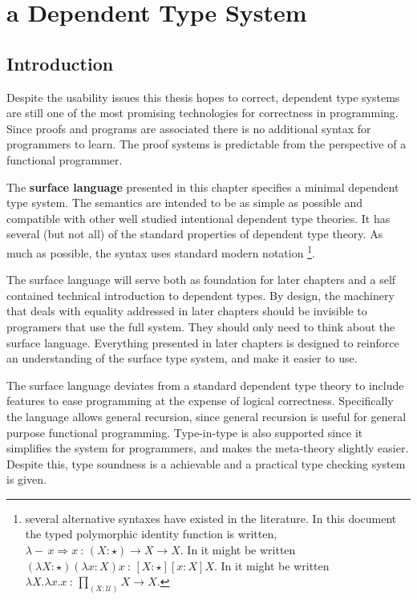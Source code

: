 \chapter{a Dependent Type System} \label{chapter:Surface} \thispagestyle{myheadings}

\section{Introduction}

Despite the usability issues this thesis hopes to correct, dependent type systems are still one of the most promising technologies for correctness in programming.
Since proofs and programs are associated there is no additional syntax for programmers to learn.
The proof systems is predictable from the perspective of a functional programmer.

The \textbf{surface language} presented in this chapter specifies a minimal dependent type system.
The semantics are intended to be as simple as possible and compatible with other well studied intentional dependent type theories.
It has several (but not all) of the standard properties of dependent type theory.
As much as possible, the syntax uses standard modern notation \footnote{several alternative syntaxes have existed in the literature.
In this document the typed polymorphic identity function is written, $\lambda-\,x\Rightarrow x\ :\,\left(X:\star\right)\rightarrow X\rightarrow X$.
In \cite{10.1016/0890-5401(88)90005-3} it might be written $\left(\lambda X:\star\right)\left(\lambda x:X\right)x\ :\,\left[X:\star\right]\left[x:X\right]X$.
In \cite{HoTTbook} it might be written $\lambda X.\lambda x.x\ :\,\underset{\left(X:\mathcal{U}\right)}{\prod}X\rightarrow X$.}.


The surface language will serve both as foundation for later chapters and a self contained technical introduction to dependent types.
By design, the machinery that deals with equality addressed in later chapters should be invisible to programers that use the full system.
They should only need to think about the surface language.
Everything presented in later chapters is designed to reinforce an understanding of the surface type system, and make it easier to use.


The surface language deviates from a standard dependent type theory to include features to ease programming at the expense of logical correctness.
Specifically the language allows general recursion, since general recursion is useful for general purpose functional programming.
Type-in-type is also supported since it simplifies the system for programmers, and makes the meta-theory slightly easier.
Despite this, type soundness is a achievable and a practical type checking system is given.

